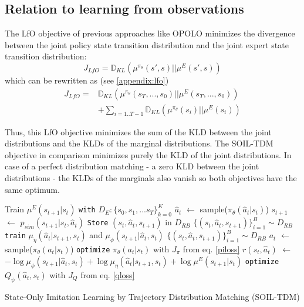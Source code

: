 \documentclass{article}
\begin{document}
\subsection{Relation to learning from observations}
The LfO objective of previous approaches like OPOLO minimizes the divergence between the joint policy state transition distribution and the joint expert state transition distribution:
\begin{equation}
    J_{LfO} = \mathbb{D}_{KL}(\mu^{\pi_{\theta}}(s',s)||\mu^E(s',s))
\end{equation}
which can be rewritten as (see \ref{appendix:lfo})
\begin{equation}
\begin{aligned}
J_{LfO} = & \mathbb{D}_{KL}(\mu^{\pi_{\theta}}(s_T,...,s_0)||\mu^E(s_T,...,s_0)) 
\\& + \sum_{i = 1..T-1} \mathbb{D}_{KL}(\mu^{\pi_{\theta}}(s_i)||\mu^E(s_i))
\end{aligned}
\end{equation}

Thus, this LfO objective minimizes the sum of the KLD between the joint distributions and the KLDs of the marginal distributions. The SOIL-TDM objective in comparison minimizes purely the KLD of the joint distributions. In case of a perfect distribution matching - a zero KLD between the joint distributions - the KLDs of the marginals also vanish so both objectives have the same optimum.



\begin{algorithm}[t]
\begin{algorithmic}[1]  
\State Train $\mu^{E}(s_{t+1}|s_{t})$ \texttt{with} $D_E:\lbrace s_0, s_1, ...s_T \rbrace^K_{k=0}$
 
    \State $\hat{a}_t$ $\gets$ sample($\pi_{\theta}(\hat{a}_t|s_t)$) 
    \State $s_{t+1}$ $\gets$ $p_{sim}(s_{t+1} | s_{t}, \hat{a}_t)$ 
    \State \texttt{Store} $(s_t, \hat{a}_t, s_{t+1})$ in $D_{RB}$
\EndFor 
{} 
    \State $\{(s_t, \hat{a}_t, s_{t+1})\}^{B}_{i=1} \sim D_{RB}$ 
    \State \texttt{train} $\mu_{\eta}(\hat{a}_t|s_{t+1},s_t)$ and $\mu_{\phi}(s_{t+1}|\hat{a}_t,s_t)$ 
\EndFor
{} 
    \State  $\{(s_t, \hat{a}_t, s_{t+1})\}^{B}_{i=1} \sim D_{RB}$ 
    \State $a_t$ $\gets$ sample($\pi_{\theta}(a_t|s_t)$)
    \State \texttt{optimize} $\pi_{\theta}(a_t|s_t)$ with $J_{\pi}$ from eq. \ref{piloss} %
    \State {}
    \State $r(s_t,\hat{a}_t)$ $\gets$ $-\log \mu_{\phi}(s_{t+1}|\hat{a}_t,s_t) + \log \mu_{\eta}(\hat{a}_t|s_{t+1},s_t) + \log  \mu^{E}(s_{t+1}|s_t)$ 
    \State \texttt{optimize} $Q_{\psi}(\hat{a}_t,s_t)$ with $J_{Q}$ from eq. \ref{qloss}  %
\EndFor
\EndFor
\EndProcedure  
\end{algorithmic}  
\caption{State-Only Imitation Learning by Trajectory Distribution Matching (SOIL-TDM)}\label{alg:SOIL-TDM}
\end{algorithm}
\end{document}
